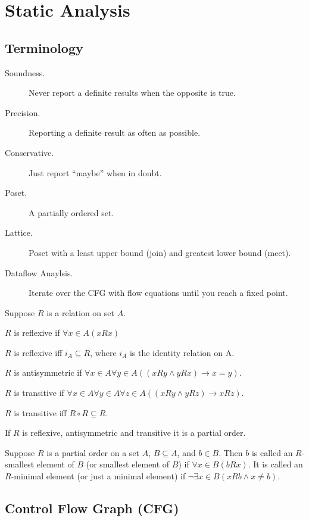 \chapter{Static Analysis}

\section{Terminology}

\begin{description}
  \item[Soundness.] Never report a definite results when the opposite is true.
  \item[Precision.] Reporting a definite result as often as possible.
  \item[Conservative.] Just report ``maybe'' when in doubt.
  \item[Poset.] A partially ordered set.
  \item[Lattice.] Poset with a least upper bound (join) and greatest lower bound
                  (meet).
  \item[Dataflow Anaylsis.] Iterate over the CFG with flow equations until you
                            reach a fixed point.
\end{description}

Suppose $R$ is a relation on set $A$.

$R$ is reflexive if $\forall x \in A (x R x)$

$R$ is reflexive iff $i_A \subseteq R$, where $i_A$ is the identity  relation
on A.

$R$ is antisymmetric if $\forall x \in A \forall y \in A ((x R y \land y R x)
\rightarrow x = y)$.

$R$ is transitive if $\forall x \in A \forall y \in A \forall z \in A
((x R y \land y R z) \rightarrow x R z)$.

$R$ is transitive iff $R \circ R \subseteq R$.

If $R$ is reflexive, antisymmetric and transitive it is a partial order.

Suppose $R$ is a partial order on a set $A$, $B \subseteq A$, and $b \in B$.
Then $b$ is called an $R$-smallest element of $B$ (or smallest element of $B$)
if $\forall x \in B (b R x)$. It is called  an $R$-minimal element (or just a
minimal element) if $\lnot \exists x \in B (x R b \land x \neq b)$.

\section{Control Flow Graph (CFG)}

